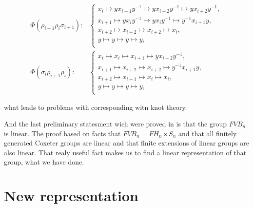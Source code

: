 \documentclass{article}
\begin{document}
\begin{align*}

\Phi(\rho_{i+1}\rho_i\sigma_{i+1}):&

\begin{cases}

x_i \mapsto yx_{i+1}y^{-1} \mapsto yx_{i+2}y^{-1} \mapsto yx_{i+2}y^{-1},\\

x_{i+1} \mapsto yx_iy^{-1} \mapsto yx_iy^{-1} \mapsto y^{-1}x_{i+1}y,\\

x_{i+2} \mapsto x_{i+2} \mapsto x_{i+2} \mapsto x_i,\\

y \mapsto y\mapsto y \mapsto y, \\

\end{cases} \\

\Phi(\sigma_i\rho_{i+1}\rho_i):&

\begin{cases}

x_i \mapsto x_i \mapsto x_{i+1}  \mapsto yx_{i+2}y^{-1},\\

x_{i+1} \mapsto x_{i+2} \mapsto x_{i+2} \mapsto y^{-1}x_{i+1}y,\\

x_{i+2} \mapsto x_{i+1} \mapsto x_i\mapsto x_i,\\

y \mapsto y\mapsto y \mapsto y, \\

\end{cases}

\end{align*}



 what leads to problems with corresponding witn knot theory. 



\vspace{6pt}And the last preliminary statesment wich were proved in \cite{BarBelDom} is that the group $FVB_n$ is linear. The proof based on facts that $FVB_n = FH_n \rtimes S_n$ and that all finitely generated Coxeter groups are linear and that finite extensions of linear groups are also linear. That realy useful fact makes us to find a linear representation of that group, what we have done.



\section{New representation}
\end{document}
